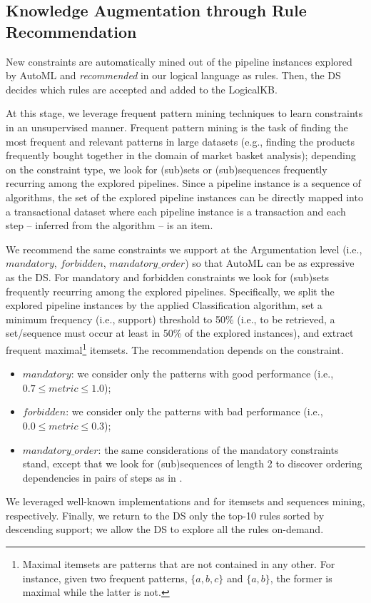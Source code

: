 \subsection{Knowledge Augmentation through Rule Recommendation}

New constraints are automatically mined out of the pipeline instances explored by AutoML and \emph{recommended} in our logical language as rules.
Then, the DS decides which rules are accepted and added to the LogicalKB.


At this stage, we leverage frequent pattern mining techniques to learn constraints in an unsupervised manner.
Frequent pattern mining is the task of finding the most frequent and relevant patterns in large datasets (e.g., finding the products frequently bought together in the domain of market basket analysis); depending on the constraint type, we look for (sub)sets \cite{srikant1995mining} or (sub)sequences \cite{srikant1996mining} frequently recurring among the explored pipelines.
Since a pipeline instance is a sequence of algorithms, the set of the explored pipeline instances can be directly mapped into a transactional dataset \cite{srikant1995mining} where each pipeline instance is a transaction and each step -- inferred from the algorithm -- is an item.

We recommend the same constraints we support at the Argumentation level (i.e., $mandatory$, $forbidden$, $mandatory\_order$) so that AutoML can be as expressive as the DS.
For mandatory and forbidden constraints we look for (sub)sets \cite{srikant1995mining} frequently recurring among the explored pipelines.
Specifically, we split the explored pipeline instances by the applied Classification algorithm, set a minimum frequency (i.e., support) threshold to 50\% (i.e., to be retrieved, a set/sequence must occur at least in 50\% of the explored instances), and extract frequent maximal\footnote{Maximal itemsets are patterns that are not contained in any other.
For instance, given two frequent patterns, $\{a, b, c\}$ and $\{a, b\}$, the former is maximal while the latter is not.
}
itemsets.
The recommendation depends on the constraint.
\begin{itemize}
    \item $mandatory$: we consider only the patterns with good performance (i.e., $0.7 \leq metric \leq 1.0$); 
    \item $forbidden$: we consider only the patterns with bad performance (i.e., $0.0 \leq metric \leq 0.3$);
    \item $mandatory\_order$: the same considerations of the mandatory constraints stand, except that we look for (sub)sequences \cite{srikant1996mining} of length 2 to discover ordering dependencies in pairs of steps as in \cite{giovanelli2021data}.   
\end{itemize}
We leveraged well-known implementations \cite{raschkas_2018_mlxtend} and \cite{seq2pat2022} for itemsets and sequences mining, respectively.
Finally, we return to the DS only the top-10 rules sorted by descending support; we allow the DS to explore all the rules on-demand.

